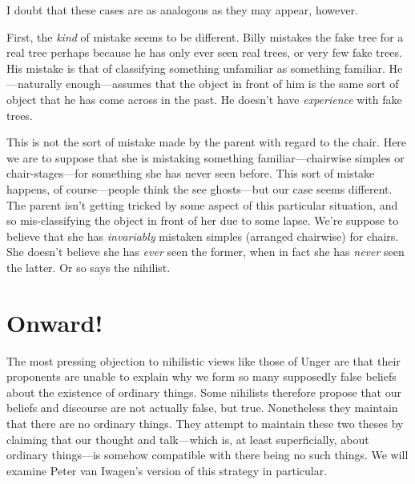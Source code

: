 \documentclass[11pt]{standalone} \newif\ifstandlone \standalonetrue
\begin{document}
\begin{spacing}{1.5}
I doubt that these cases are as analogous as they may appear, however.

First, the {\em kind} of mistake seems to be different.  Billy
mistakes the fake tree for a real tree perhaps because he has only
ever seen real trees, or very few fake trees.  His mistake is that of
classifying something unfamiliar as something familiar.
He---naturally enough---assumes that the object in front of him is the
same sort of object that he has come across in the past.  He doesn't
have {\em experience} with fake trees.

This is not the sort of mistake made by the parent with regard to the
chair.  Here we are to suppose that she is mistaking something
familiar---chairwise simples or chair-stages---for something she has
never seen before.  This sort of mistake happens, of course---people
think the see ghosts---but our case seems different.  The parent isn't
getting tricked by some aspect of this particular situation, and so
mis-classifying the object in front of her due to some lapse.  We're
suppose to believe that she has {\em invariably} mistaken simples
(arranged chairwise) for chairs.  She doesn't believe she has {\em
  ever} seen the former, when in fact she has {\em never} seen the
latter.  Or so says the nihilist.

\section{Onward!}
The most pressing objection to nihilistic views like those of Unger
are that their proponents are unable to explain why we form so many
supposedly false beliefs about the existence of ordinary things.  Some
nihilists therefore propose that our beliefs and discourse are not
actually false, but true.  Nonetheless they maintain that there are no
ordinary things.  They attempt to maintain these two theses by
claiming that our thought and talk---which is, at least superficially,
about ordinary things---is somehow compatible with there being no such
things.  We will examine Peter van Iwagen's version of this strategy
in particular.

\ifstandalone


\end{spacing}
\fi
\end{document}
